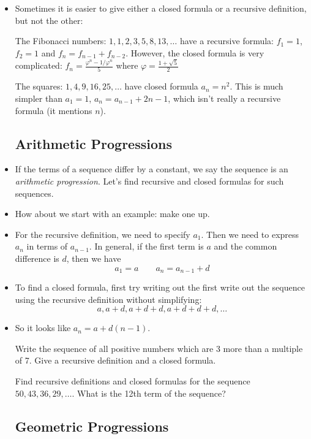 \begin{itemize}
\item Sometimes it is easier to give either a closed formula or a recursive definition, but not the other:

	The Fibonacci numbers: $1, 1, 2, 3, 5, 8, 13, \ldots$ have a recursive formula: $f_1 = 1$, $f_2 = 1$ and $f_n = f_{n-1} + f_{n-2}$.  However, the closed formula is very complicated: $f_n = \frac{\varphi^n - 1/\varphi^n}{5}$ where $\varphi = \frac{1 + \sqrt 5}{2}$

	The squares: $1, 4, 9, 16, 25, \ldots$ have closed formula $a_n = n^2$.  This is much simpler than $a_1 = 1$, $a_n = a_{n-1} + 2n - 1$, which isn't really a recursive formula (it mentions $n$).

\subsection*{Arithmetic Progressions}

\item If the terms of a sequence differ by a constant, we say the sequence is an {\em arithmetic progression}.  Let's find recursive and closed formulas for such sequences.

\item How about we start with an example: make one up.

\item For the recursive definition, we need to specify $a_1$.  Then we need to express $a_n$ in terms of $a_{n-1}$.  In general, if the first term is $a$ and the common difference is $d$, then we have \[ a_1 = a \qquad a_n=a_{n-1}+d\]

\item To find a closed formula, first try writing out the first write out the sequence using the recursive definition without simplifying:
\[a, a+d, a+d+d, a+d+d+d, \ldots\]

\item So it looks like $a_n = a+d(n-1)$.  

 Write the sequence of all positive numbers which are 3 more than a multiple of 7.  Give a recursive definition and a closed formula.

 Find recursive definitions and closed formulas for the sequence $50, 43, 36, 29, \ldots$.  What is the 12th term of the sequence? 

\subsection*{Geometric Progressions}


\end{itemize}

